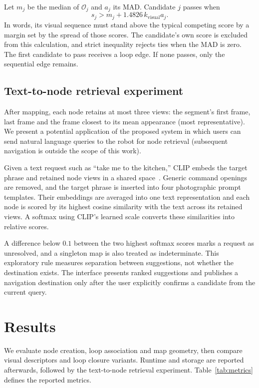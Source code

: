 \documentclass[5p,twocolumn,nonatbib,reversenotenum]{elsarticle}
\begin{document}
Let $m_j$ be the median of $\mathcal{O}_j$ and $a_j$ its MAD. Candidate $j$ passes when
\begin{equation}
    s_j>m_j+1.4826\,k_{\mathrm{visual}}a_j.
\end{equation}
In words, its visual sequence must stand above the typical competing score by a margin set by the spread of those scores. The candidate's own score is excluded from this calculation, and strict inequality rejects ties when the MAD is zero. The first candidate to pass receives a loop edge. If none passes, only the sequential edge remains.

\subsection{Text-to-node retrieval experiment}
After mapping, each node retains at most three views: the segment's first frame, last frame and the frame closest to its mean appearance (most representative). We present a potential application of the proposed system in which users can send natural language queries to the robot for node retrieval (subsequent navigation is outside the scope of this work).

Given a text request such as ``take me to the kitchen,'' CLIP embeds the target phrase and retained node views in a shared space~\cite{radford2021learningtransferablevisualmodels}. Generic command openings are removed, and the target phrase is inserted into four photographic prompt templates. Their embeddings are averaged into one text representation and each node is scored by its highest cosine similarity with the text across its retained views. A softmax using CLIP's learned scale converts these similarities into relative scores.

A difference below $0.1$ between the two highest softmax scores marks a request as unresolved, and a singleton map is also treated as indeterminate. This exploratory rule measures separation between suggestions, not whether the destination exists. The interface presents ranked suggestions and publishes a navigation destination only after the user explicitly confirms a candidate from the current query.

\section{Results}

We evaluate node creation, loop association and map geometry, then compare visual descriptors and loop closure variants. Runtime and storage are reported afterwards, followed by the text-to-node retrieval experiment. Table~\ref{tab:metrics} defines the reported metrics.
\end{document}
